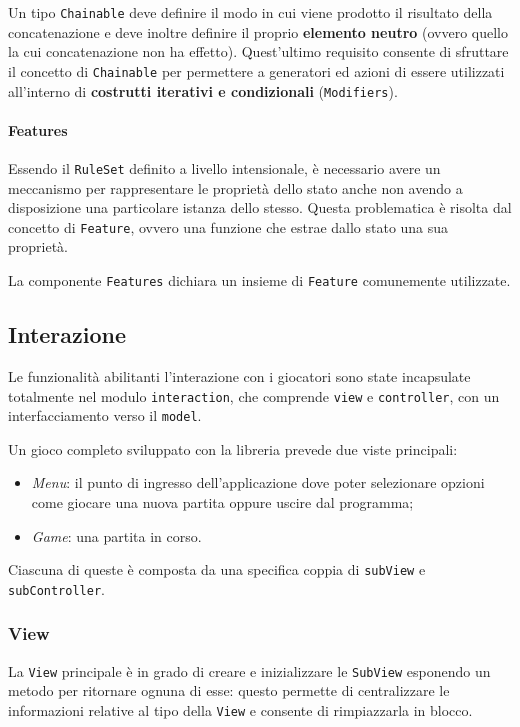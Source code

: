 Un tipo \texttt{Chainable} deve definire il modo in cui viene prodotto il risultato della concatenazione e deve inoltre definire il proprio \textbf{elemento neutro} (ovvero quello la cui concatenazione non ha effetto).
%
Quest'ultimo requisito consente di sfruttare il concetto di \texttt{Chainable} per permettere a generatori ed azioni di essere utilizzati all'interno di \textbf{costrutti iterativi e condizionali} (\texttt{Modifiers}).

\paragraph{Features}
Essendo il \texttt{RuleSet} definito a livello intensionale, è necessario avere un meccanismo per rappresentare le proprietà dello stato anche non avendo a disposizione una particolare istanza dello stesso.
%
Questa problematica è risolta dal concetto di \texttt{Feature}, ovvero una funzione che estrae dallo stato una sua proprietà.

La componente \texttt{Features} dichiara un insieme di \texttt{Feature} comunemente utilizzate.

\subsection{Interazione}

Le funzionalità abilitanti l'interazione con i giocatori sono state incapsulate totalmente nel modulo \texttt{interaction}, che comprende \texttt{view} e \texttt{controller}, con un interfacciamento verso il \texttt{model}.

Un gioco completo sviluppato con la libreria prevede due viste principali:
\begin{itemize}
    \item \textit{Menu}: il punto di ingresso dell'applicazione dove poter selezionare opzioni come giocare una nuova partita oppure uscire dal programma;
    \item \textit{Game}: una partita in corso.
\end{itemize}
%
Ciascuna di queste è composta da una specifica coppia di \texttt{subView} e \texttt{subController}.
%

\subsubsection{View}
La \texttt{View} principale è in grado di creare e inizializzare le \texttt{SubView} esponendo un metodo per ritornare ognuna di esse: questo permette di centralizzare le informazioni relative al tipo della \texttt{View} e consente di rimpiazzarla in blocco. %
